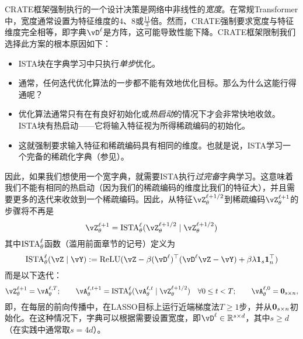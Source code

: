\documentclass[../../book-main.tex]{subfiles}
\begin{document}
CRATE框架强制执行的一个设计决策是网络中非线性的\textit{宽度}。在常规Transformer中，宽度通常设置为特征维度的\(4\)、\(8\)或\(\frac{11}{3}\)倍。然而，CRATE强制要求宽度与特征维度完全相等，即字典\(\vD^{\ell}\)是方阵，这可能导致性能下降。CRATE框架限制我们选择此方案的根本原因如下：
\begin{itemize}
    \item ISTA块在字典学习中只执行\textit{单步}优化。
    \item 通常，任何迭代优化算法的一步都不能有效地优化目标。那么为什么这能行得通呢？
    \item 优化算法通常只有在有良好初始化或\textit{热启动}的情况下才会非常快地收敛。ISTA块有热启动——它将输入特征视为所得稀疏编码的初始化。
    \item 这就强制要求输入特征和稀疏编码具有相同的维度。也就是说，ISTA学习一个完备的稀疏化字典（参见）。
\end{itemize}
因此，如果我们想使用一个宽字典，就需要ISTA执行\textit{过完备}字典学习。这意味着我们不能有相同的热启动（因为我们的稀疏编码的维度比我们的特征大），并且需要更多的迭代来收敛到一个稀疏编码。因此，从特征\(\vZ_{\theta}^{\ell + 1/2}\)到稀疏编码\(\vZ_{\theta}^{\ell + 1}\)的步骤将不再是
\begin{equation}
    \vZ_{\theta}^{\ell + 1} = \ISTA_{\theta}^{\ell}(\vZ_{\theta}^{\ell + 1/2} \mid \vZ_{\theta}^{\ell + 1/2})
\end{equation}
其中\(\operatorname{ISTA}_{\theta}^{\ell}\)函数（滥用前面章节的记号）定义为
\begin{equation}
    \ISTA_{\theta}^{\ell}(\vZ \mid \vY) := \ReLU(\vZ - \beta (\vD^{\ell})^{\top}(\vD^{\ell}\vZ - \vY) + \beta \lambda \vone_{s}\vone_{n}^{\top})
\end{equation}
而是以下迭代：
\begin{equation}
    \vZ_{\theta}^{\ell + 1} = \vA_{\theta}^{\ell, T}; \qquad \vA_{\theta}^{\ell, t + 1} = \ISTA_{\theta}^{\ell}(\vA_{\theta}^{\ell, t} \mid \vZ_{\theta}^{\ell + 1/2}) \quad \forall 0 \leq t < T; \qquad \vA_{\theta}^{\ell, 0} = \vzero_{s \times n},
\end{equation}
即，在每层的前向传播中，在LASSO目标上运行近端梯度法\(T \geq 1\)步，并从\(\bm{0}_{s \times n}\)初始化。在这种情况下，字典可以根据需要设置宽度，即\(\vD^{\ell} \in \R^{s \times d}\)，其中\(s \geq d\)（在实践中通常取\(s = 4d\)）。
\end{document}
